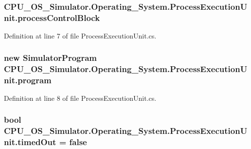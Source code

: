 \subsubsection[{process\+Control\+Block}]{ C\+P\+U\+\_\+\+O\+S\+\_\+\+Simulator.\+Operating\+\_\+\+System.\+Process\+Execution\+Unit.\+process\+Control\+Block\hspace{0.3cm}{\ttfamily [private]}}\label{class_c_p_u___o_s___simulator_1_1_operating___system_1_1_process_execution_unit_ae2624c872da8f348b1a9fcba8d6734cf}


Definition at line 7 of file Process\+Execution\+Unit.\+cs.

\hypertarget{class_c_p_u___o_s___simulator_1_1_operating___system_1_1_process_execution_unit_ab82d2f53e3b27f272a0c5a9cc6222e9d}{}
\subsubsection[{program}]{\setlength{\rightskip}{0pt plus 5cm}new {\bf Simulator\+Program} C\+P\+U\+\_\+\+O\+S\+\_\+\+Simulator.\+Operating\+\_\+\+System.\+Process\+Execution\+Unit.\+program\hspace{0.3cm}{\ttfamily [private]}}\label{class_c_p_u___o_s___simulator_1_1_operating___system_1_1_process_execution_unit_ab82d2f53e3b27f272a0c5a9cc6222e9d}


Definition at line 8 of file Process\+Execution\+Unit.\+cs.

\hypertarget{class_c_p_u___o_s___simulator_1_1_operating___system_1_1_process_execution_unit_ad48af599eaa4929c947241f3d8bd754e}{}
\subsubsection[{timed\+Out}]{\setlength{\rightskip}{0pt plus 5cm}bool C\+P\+U\+\_\+\+O\+S\+\_\+\+Simulator.\+Operating\+\_\+\+System.\+Process\+Execution\+Unit.\+timed\+Out = false\hspace{0.3cm}{\ttfamily [private]}}\label{class_c_p_u___o_s___simulator_1_1_operating___system_1_1_process_execution_unit_ad48af599eaa4929c947241f3d8bd754e}


